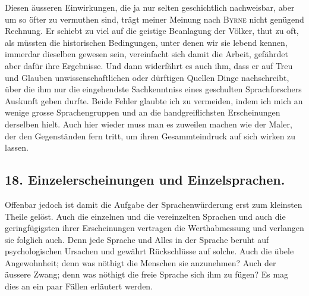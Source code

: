 \begin{sloppypar}Diesen äusseren Einwirkungen, die ja nur selten geschichtlich nach\label{fp.406}weisbar, aber um so öfter zu vermuthen sind, trägt meiner Meinung nach \textsc{Byrne} nicht genügend Rechnung. Er schiebt zu viel auf die geistige Beanlagung der Völker, thut zu oft, als müssten die historischen Bedingungen, unter denen wir sie lebend kennen, immerdar dieselben gewesen sein, vereinfacht sich damit die Arbeit, gefährdet aber dafür ihre Ergebnisse. Und dann widerfährt es auch ihm, dass er auf Treu und Glauben unwissenschaftlichen oder dürftigen Quellen Dinge nachschreibt, über die ihm nur die eingehendste Sachkenntniss eines geschulten Sprachforschers Auskunft geben durfte. Beide Fehler glaubte ich zu vermeiden, indem ich mich an wenige grosse Sprachengruppen und an die handgreiflichsten Erscheinungen derselben hielt. Auch hier wieder muss man es zuweilen machen wie der Maler, der den Gegenständen fern tritt, um ihren Gesammteindruck auf sich wirken zu lassen.\end{sloppypar}

\subsection*{18. Einzelerscheinungen und Einzelsprachen.}\label{IV.IV.18}

Offenbar jedoch ist damit die Aufgabe der Sprachenwürderung erst zum kleinsten Theile gelöst. Auch die einzelnen und die vereinzelten Sprachen und auch die geringfügigsten ihrer Erscheinungen vertragen die Werthabmessung und verlangen sie folglich auch. Denn jede Sprache und Alles in der Sprache beruht auf psychologischen Ursachen und gewährt Rückschlüsse auf solche. \label{sp.428} Auch die übele Angewohnheit; denn was nöthigt die Menschen sie anzunehmen? Auch der äussere Zwang; denn was nöthigt die freie Sprache sich ihm zu fügen? Es mag dies an ein paar Fällen erläutert werden.

